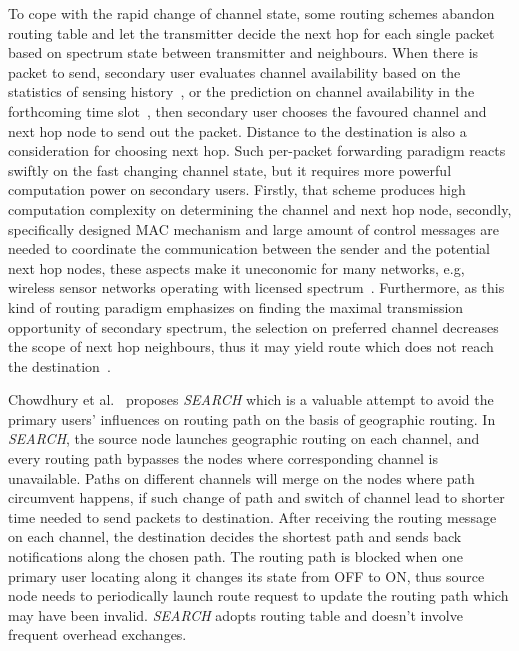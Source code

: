 To cope with the rapid change of channel state, some routing schemes abandon routing table and let the transmitter decide the next hop for each single packet based on spectrum state between transmitter and neighbours.
When there is packet to send, secondary user evaluates channel availability based on the statistics of sensing history~\cite{routing-crn-icc11}, or the prediction on channel availability in the forthcoming time slot~\cite{routing-crn-jsac12}, then secondary user chooses the favoured channel and next hop node to send out the packet.
Distance to the destination is also a consideration for choosing next hop.
Such per-packet forwarding paradigm reacts swiftly on the fast changing channel state, but it requires more powerful computation power on secondary users.
Firstly, that scheme produces high computation complexity on determining the channel and next hop node, secondly, specifically designed MAC mechanism and large amount of control messages are needed to coordinate the communication between the sender and the potential next hop nodes, these aspects make it uneconomic for many networks, e.g, wireless sensor networks operating with licensed spectrum~\cite{delay-cogwsn-2014}.
Furthermore, as this kind of routing paradigm emphasizes on finding the maximal transmission opportunity of secondary spectrum, the selection on preferred channel decreases the scope of next hop neighbours, thus it may yield route which does not reach the destination~\cite{commag-Khalife08, spectrumDecision_2013mass}.


Chowdhury et al.~\cite{search_geo_routing_chowdhury} proposes \textit{SEARCH} which is a valuable attempt to avoid the primary users' influences on routing path on the basis of geographic routing. 
In \textit{SEARCH}, the source node launches geographic routing on each channel, and every routing path bypasses the nodes where corresponding channel is unavailable.
Paths on different channels will merge on the nodes where path circumvent happens, if such change of path and switch of channel lead to shorter time needed to send packets to destination.
After receiving the routing message on each channel, the destination decides the shortest path and sends back notifications along the chosen path.
The routing path is blocked when one primary user locating along it changes its state from OFF to ON, thus source node needs to periodically launch route request to update the routing path which may have been invalid.
\textit{SEARCH} adopts routing table and doesn't involve frequent overhead exchanges.


